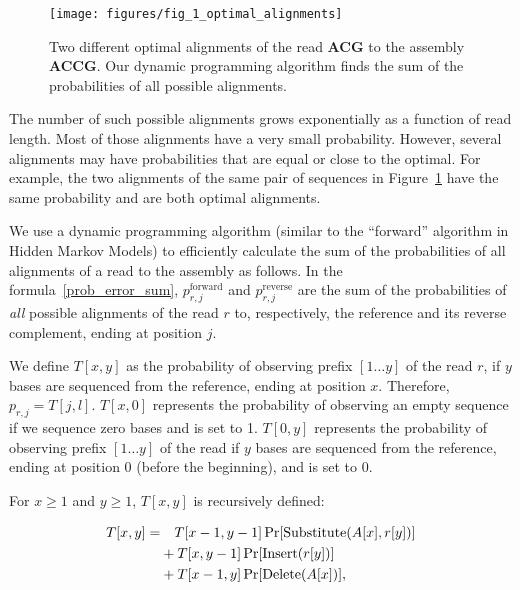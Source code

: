 \documentclass[12pt,\mydriver]{thesis}
\begin{document}
\begin{figure}[h!]
\begin{center}
\texttt{[image: figures/fig\_1\_optimal\_alignments]}
\end{center}
\renewcommand{\baselinestretch}{1}
\small\normalsize
\begin{quote}
\caption[Multiple optimal read alignments.]{Two different optimal alignments of the read \textbf{ACG} to the assembly \textbf{ACCG}. Our dynamic programming algorithm finds the sum of the probabilities of all possible alignments.}
\label{different_optimal_alignments}
\end{quote}
\end{figure}
\renewcommand{\baselinestretch}{2}
\small\normalsize




The number of such possible alignments grows exponentially as a
function of read length.  Most of those alignments have a very
small probability.  However, several alignments may have probabilities
that are equal or close to the optimal.  For example, the two alignments
of the same pair of sequences in
Figure~\ref{different_optimal_alignments} have the same probability
and are both optimal alignments.

We use a dynamic programming algorithm (similar to the ``forward''
algorithm in Hidden Markov Models) to efficiently calculate the sum of the
probabilities of all alignments of a read to the assembly as follows.
In the formula~\eqref{prob_error_sum}, $p^{\text{forward}}_{r,j}$ and
$p^{\text{reverse}}_{r,j}$ are the sum of the probabilities
of \emph{all} possible alignments of the read $r$ to, respectively, the
reference and its reverse complement, ending at position $j$.

We define $T[x,y]$ as the probability of observing prefix $[1 \ldots
y]$ of the read $r$, if $y$ bases are sequenced from the reference, ending
at position $x$.  Therefore, $p_{r, j} = T[j, l]$. $T[x, 0]$ represents the probability of observing an empty sequence if
we sequence zero bases and is set to 1.  $T[0, y]$
represents the probability of observing prefix $[1 \ldots y]$ of the
read if $y$ bases are sequenced from the reference, ending at position
$0$ (before the beginning), and is set to 0.

For $x \geq 1$ and $y \geq 1$, $T[x, y]$ is recursively defined:

\begin{align}
\label{dp_single}
  T[x, y] = & \quad T[x - 1, y - 1] \Pr[\operatorname{Substitute}(A[x], r[y])]  \\
  & + T[x, y - 1]  \Pr[\operatorname{Insert}(r[y])]  \notag\\
  & + T[x - 1, y]  \Pr[\operatorname{Delete}(A[x])],  \notag
\end{align}
\end{document}
